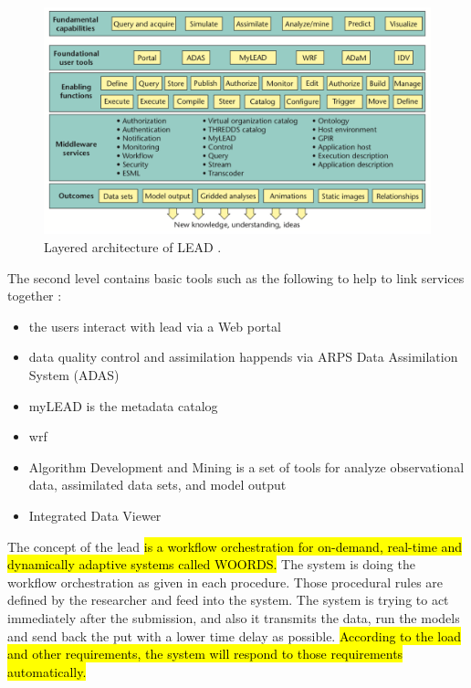 \begin{figure}[htp]
    \centering
    \includegraphics[width=1.0\textwidth]{lit/lead/LEAD-system-Fundamental-capabilities-familiar-to-meteorologists-are-shown-in-the-top_W640.png}
    \caption[Layered architecture of LEAD]{Layered architecture of LEAD \cite{Droegemeier2005Service-OrientedWeather}.}
    \label{fi:lead_system}
\end{figure}

The second level contains basic tools such as the following to help to link services together  \cite{Droegemeier2005Service-OrientedWeather}:
\begin{itemize}
    \item the users interact with \acrshort{lead} via a Web portal
    \item data quality control and assimilation happends via ARPS Data Assimilation System (ADAS)
    \item myLEAD is the metadata catalog
    \item \acrfull{wrf} \cite{MesoscaleMicroscaleMeteorologyLaboratoryWeatherModel}
    \item Algorithm Development and Mining is a set of tools for analyze observational data, assimilated data sets, and model output 
    \item Integrated Data Viewer 
\end{itemize}

The concept of the \acrshort{lead} \hl{is a workflow orchestration for on-demand, real-time and dynamically adaptive systems called WOORDS.} The system is doing the workflow orchestration as given in each procedure. Those procedural rules are defined by the researcher and feed into the system. The system is trying to act immediately after the submission, and also it transmits the data, run the models and send back the put with a lower time delay as possible. \hl{According to the load and other requirements, the system will respond to those requirements automatically.}

